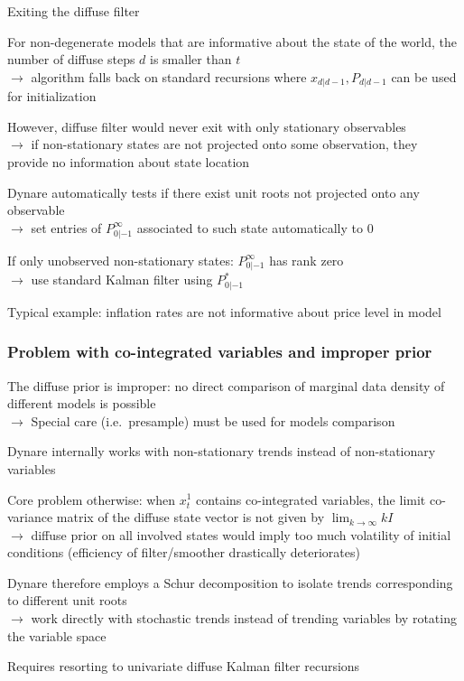 \documentclass[handout,usepdftitle=false,xcolor=dvipsnames,aspectratio=169]{beamer}
\begin{document}
\begin{frame}{Exiting the diffuse filter}
  \begin{witemize}
    \item For non-degenerate models that are informative about the state of the world, the number of diffuse steps $d$ is smaller than $t$\\
    $\rightarrow$ algorithm falls back on standard recursions where $x_{d|d-1},P_{d|d-1}$ can be used for initialization
    \item However, diffuse filter would never exit with only stationary observables\\
    $\rightarrow$ if non-stationary states are not projected onto some observation, they provide no information about state location
    \item Dynare automatically tests if there exist unit roots not projected onto any observable\\
    $\rightarrow$ set entries of $P_{0|-1}^{\infty}$ associated to such state automatically to 0
    \item If only unobserved non-stationary states:  $P_{0|-1}^{\infty}$  has rank zero\\
    $\rightarrow$ use standard Kalman filter using $P_{0|-1}^*$
    \item Typical example: inflation rates are not informative about price level in model
  \end{witemize}

\end{frame}

\begin{frame}
  \frametitle{Problem with co-integrated variables and improper prior}
  \begin{witemize}
    \item The diffuse prior is improper: no direct comparison of marginal data density of different models is possible\\
    $\rightarrow$ Special care (i.e.\ presample) must be used for models comparison
    \item Dynare internally works with non-stationary trends instead of non-stationary variables
    \item Core problem otherwise: when $x^1_t$ contains co-integrated variables, the limit co-variance matrix of the diffuse state vector is not given by $\lim_{k \to \infty} kI$\\
    $\rightarrow$ diffuse prior on all involved states would imply too much volatility of initial conditions (efficiency of filter/smoother drastically deteriorates)
    \item Dynare therefore employs a Schur decomposition to isolate trends corresponding to different unit roots\\
    $\rightarrow$ work directly with stochastic trends instead of trending variables by rotating the variable space
    \item Requires resorting to univariate diffuse Kalman filter recursions \parencite{KoopmanDurbin2000}
  \end{witemize}
\end{frame}
\end{document}
